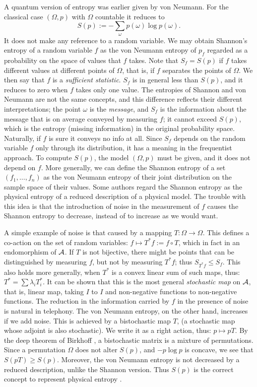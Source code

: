 \documentclass[12pt]{article}
\begin{document}
A quantum version of entropy was earlier given by von Neumann.
For the classical case $(\Omega,p)$ with $\Omega$ countable it reduces to
\begin{equation}
S(p):=-\sum_\omega p(\omega)\log p(\omega).
\end{equation}
It does not make any reference to a random variable. We may obtain
Shannon's entropy of a random variable $f$ as the von Neumann entropy of
$p_f$ regarded as a probability on the space of values that $f$ takes.
Note that $S_f=S(p)$ if $f$ takes different values at
different points of $\Omega$, that is, if $f$ separates the points of
$\Omega$. We then say that $f$ is a {\em sufficient statistic}. $S_f$ is in
general less than $S(p)$, and it reduces to zero when
$f$ takes only one value. The entropies of Shannon and von Neumann are not
the same concepts, and this difference reflects their different
interpretations; the point $\omega$ is the {\em message},
and $S_f$ is the information about the message that is
on average conveyed by measuring $f$; it cannot exceed $S(p)$, which is the
entropy (missing information) in the original probability space. Naturally,
if $f$ is sure it conveys no info at all. Since 
$S_f$ depends on the random variable $f$ only through its distribution, it
has a meaning in the frequentist approach.
To compute $S(p)$, the model $(\Omega,p)$ must be given, and it
does not depend on $f$. More generally, we can define the Shannon entropy
of a set $(f_1,\ldots,f_n)$ as the von Neumann entropy of their joint
distribution on the sample space of their values. Some authors regard the
Shannon entropy as the physical entropy of a reduced
description of a physical model. The trouble with this idea
is that the introduction of noise in the measurement of $f$
causes the Shannon entropy to decrease, instead of to increase as we would
want.
 
A simple example of noise is that caused by a mapping $T:\Omega
\rightarrow\Omega$. This defines a co-action on the set of random variables:
$f\mapsto T^*f:=f\circ T$, which in fact in an endomorphism of ${\cal A}$.
If $T$ is not bijective, there might be points that can be distinguished
by measuring $f$, but not by measuring $T^*f$;
thus $S_{T^*f}\leq S_f$. This also holds more generally, when $T^*$ is a
convex linear sum of such maps, thus: $T^*=\sum\lambda_iT_i^*$. It can be
shown that this is the most general {\em stochastic map} on ${\cal A}$,
that is, linear map,
taking $I$ to $I$ and non-negative functions to non-negative functions.
The reduction in the information carried by $f$ in the presence of noise
is natural in telephony. The von Neumann entropy, on the other hand,
increases if we add noise. This is achieved by a bistochastic map $T$,
(a stochastic map whose adjoint is also stochastic). We write it as
a right action, thus: $p\mapsto pT$.
By the deep theorem
of Birkhoff \cite{Birkhoff,Ando}, a bistochastic matrix is a mixture of
permutations. Since a permutation $\Omega$ does not alter $S(p)$, and
$-p\log p$ is concave, we see that $S(pT)\geq S(p)$. Moreover,
the von Neumann entropy is not decreased by a reduced description, unlike
the Shannon version. Thus $S(p)$ is the
correct concept to represent physical entropy \cite{Streater}.
\end{document}

